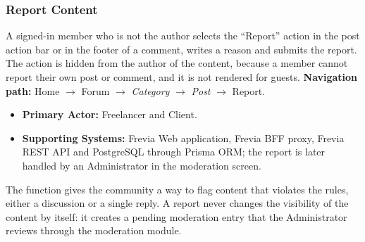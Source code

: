 
\subsubsection{ Report Content}

A signed-in member who is not the author selects the ``Report'' action in the post action bar or in
the footer of a comment, writes a reason and submits the report. The action is hidden from the
author of the content, because a member cannot report their own post or comment, and it is not
rendered for guests.\newline
\textbf{Navigation path:} Home $\rightarrow$ Forum $\rightarrow$ \textit{Category} $\rightarrow$
\textit{Post} $\rightarrow$ Report.


\begin{itemize}[leftmargin=1.6em,topsep=3pt,itemsep=2pt,parsep=0pt,label=$\bullet$]
      \item \textbf{Primary Actor:} Freelancer and Client.
      \item \textbf{Supporting Systems:} Frevia Web application, Frevia BFF proxy, Frevia REST API
            and PostgreSQL through Prisma ORM; the report is later handled by an Administrator in
            the moderation screen.
\end{itemize}

\noindent The function gives the community a way to flag content that violates the rules, either
a discussion or a single reply. A report never changes the visibility of the content by itself:
it creates a pending moderation entry that the Administrator reviews through the moderation
module.

